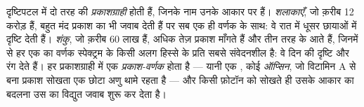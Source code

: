 \begin{definition}[प्रकाशग्राही]\label{def:g11:the-eye:photoreceptors}
दृष्टिपटल में दो तरह की \emph{प्रकाशग्राही} 
होती हैं, जिनके नाम उनके आकार पर हैं।
\emph{शलाकाएँ}, जो क़रीब 12 करोड़ हैं, बहुत मंद
प्रकाश का भी जवाब देती हैं पर सब एक ही वर्णक के साथ: वे रात में धूसर छायाओं
में दृष्टि देती हैं। \emph{शंकु}, जो क़रीब 60 लाख
हैं, अधिक तेज़ प्रकाश माँगते हैं और तीन तरह के आते हैं, जिनमें से हर एक का
वर्णक स्पेक्ट्रम के किसी अलग हिस्से के प्रति सबसे संवेदनशील है: वे दिन की
दृष्टि और रंग देते हैं। हर प्रकाशग्राही में एक \emph{प्रकाश-वर्णक} होता है
--- यानी एक , कोई \emph{ऑप्सिन}, जो विटामिन A से बना
प्रकाश सोखता एक छोटा अणु थामे रहता है --- और किसी फ़ोटॉन को सोखते ही उसके
आकार का बदलना उस  का विद्युत जवाब शुरू कर देता है।
\end{definition}

